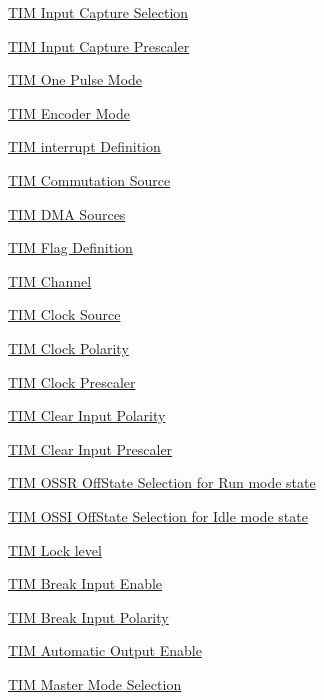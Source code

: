 \begin{DoxyCompactItemize}
\hyperlink{group___t_i_m___input___capture___selection}{T\+I\+M Input Capture Selection}
\item 
\hyperlink{group___t_i_m___input___capture___prescaler}{T\+I\+M Input Capture Prescaler}
\item 
\hyperlink{group___t_i_m___one___pulse___mode}{T\+I\+M One Pulse Mode}
\item 
\hyperlink{group___t_i_m___encoder___mode}{T\+I\+M Encoder Mode}
\item 
\hyperlink{group___t_i_m___interrupt__definition}{T\+I\+M interrupt Definition}
\item 
\hyperlink{group___t_i_m___commutation___source}{T\+I\+M Commutation Source}
\item 
\hyperlink{group___t_i_m___d_m_a__sources}{T\+I\+M D\+M\+A Sources}
\item 
\hyperlink{group___t_i_m___flag__definition}{T\+I\+M Flag Definition}
\item 
\hyperlink{group___t_i_m___channel}{T\+I\+M Channel}
\item 
\hyperlink{group___t_i_m___clock___source}{T\+I\+M Clock Source}
\item 
\hyperlink{group___t_i_m___clock___polarity}{T\+I\+M Clock Polarity}
\item 
\hyperlink{group___t_i_m___clock___prescaler}{T\+I\+M Clock Prescaler}
\item 
\hyperlink{group___t_i_m___clear_input___polarity}{T\+I\+M Clear Input Polarity}
\item 
\hyperlink{group___t_i_m___clear_input___prescaler}{T\+I\+M Clear Input Prescaler}
\item 
\hyperlink{group___t_i_m___o_s_s_r___off___state___selection__for___run__mode__state}{T\+I\+M O\+S\+S\+R Off\+State Selection for Run mode state}
\item 
\hyperlink{group___t_i_m___o_s_s_i___off___state___selection__for___idle__mode__state}{T\+I\+M O\+S\+S\+I Off\+State Selection for Idle mode state}
\item 
\hyperlink{group___t_i_m___lock__level}{T\+I\+M Lock level}
\item 
\hyperlink{group___t_i_m___break___input__enable__disable}{T\+I\+M Break Input Enable}
\item 
\hyperlink{group___t_i_m___break___polarity}{T\+I\+M Break Input Polarity}
\item 
\hyperlink{group___t_i_m___a_o_e___bit___set___reset}{T\+I\+M Automatic Output Enable}
\item 
\hyperlink{group___t_i_m___master___mode___selection}{T\+I\+M Master Mode Selection}

\end{DoxyCompactItemize}
